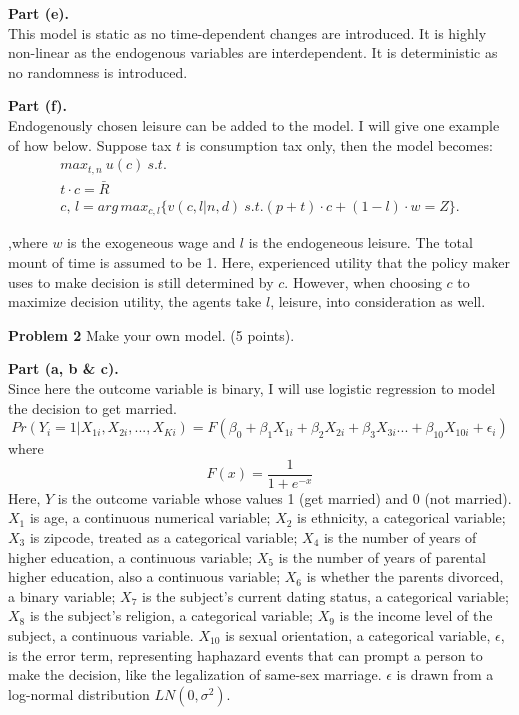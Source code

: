 \documentclass[letterpaper,12pt]{article}
\theoremstyle{definition}
\begin{document}
\textbf{Part (e).} \\
This model is static as no time-dependent changes are introduced. It is highly non-linear as the endogenous variables are interdependent. It is deterministic as no randomness is introduced. 

\textbf{Part (f).} \\
Endogenously chosen leisure can be added to the model. I will give one example of how below. Suppose tax $t$ is consumption tax only, then the model becomes:\\

\begin{align}\label{model2}
max_{t,n} \ u(c) \ s.t.\\
t \cdot c=\bar{R}\\
c,\,l = arg\,max_{c,l}\{v(c,l|n,d) \ s.t.(p+t) \cdot c+(1-l) \cdot w=Z\}.
\end{align}

,where $w$ is the exogeneous wage and $l$ is the endogeneous leisure. The total mount of time is assumed to be 1. Here, experienced utility that the policy maker uses to make decision is still determined by $c$. However, when choosing $c$ to maximize decision utility, the agents take $l$, leisure, into consideration as well.\\


\vspace{5mm}

\noindent\textbf{Problem 2}
Make your own model. (5 points).

\textbf{Part (a, b \& c).} \\
Since here the outcome variable is binary, I will use logistic regression to model the decision to get married. 
\begin{equation}\label{model3}
	Pr(Y_i=1|X_{1i}, X_{2i}, ..., X_{Ki}) = F(\beta_0+\beta_1 X_{1i}+\beta_{2} X_{2i}+ \beta_{3} X_{3i} ... + \beta_{10} X_{10i} + \epsilon_i)
\end{equation}
where
\begin{equation}
	F(x) = \frac{1}{1+e^{-x}}
\end{equation}
Here, $Y$ is the outcome variable whose values 1 (get married) and 0 (not married). $X_1$ is age, a continuous numerical variable; $X_2$ is ethnicity, a categorical variable; $X_3$ is zipcode, treated as a categorical variable; $X_4$ is the number of years of higher education, a continuous variable; $X_5$ is the number of years of parental higher education, also a continuous variable; $X_6$ is whether the parents divorced, a binary variable; $X_7$ is the subject's current dating status, a categorical variable; $X_8$ is the subject's religion, a categorical variable; $X_9$ is the income level of the subject, a continuous variable. $X_{10}$ is sexual orientation, a categorical variable, $\epsilon$, is the error term, representing haphazard events that can prompt a person to make the decision, like the legalization of same-sex marriage. $\epsilon$ is drawn from a log-normal distribution $LN(0,\sigma^2)$. 
\end{document}

